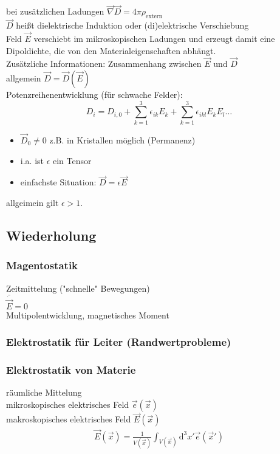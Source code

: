 \documentclass[a4paper]{article}
\begin{document}
bei zusätzlichen Ladungen $\vec{\nabla}\vec{D}=4\pi\rho_{\text{extern}}$\\
$\vec{D}$ heißt dielektrische Induktion oder (di)elektrische Verschiebung\\
Feld $\vec{E}$ verschiebt im mikroskopischen Ladungen und erzeugt damit eine
Dipoldichte, die von den Materialeigenschaften abhängt.\\
Zusätzliche Informationen: Zusammenhang zwischen $\vec{E}$ und $\vec{D}$\\
allgemein $\vec{D}=\vec{D}(\vec{E})$\\
Potenzreihenentwicklung (für schwache Felder):\\
\begin{equation}
D_i=D_{i,0}+\sum_{k=1}^3 \epsilon_{ik}E_k+\sum_{k=1}^3 \epsilon_{ikl}E_kE_l \ldots
\end{equation} 
\begin{itemize}
  \item $\vec{D}_0\neq0$ z.B. in Kristallen möglich (Permanenz)
  \item i.a. ist $\epsilon$ ein Tensor
  \item einfachste Situation: $\vec{D}=\epsilon\vec{E}$
\end{itemize}

allgeimein gilt $\epsilon>1$.

\subsection{Wiederholung}
\subsubsection{Magentostatik}
Zeitmittelung ("schnelle" Bewegungen)\\
$\bar{\dot{\vec{E}}}=0$\\
Multipolentwicklung, magnetisches Moment\\
\subsubsection{Elektrostatik für Leiter (Randwertprobleme)}
\subsubsection{Elektrostatik von Materie}
räumliche Mittelung\\
mikroskopisches elektrisches Feld $\vec{e}(\vec{x})$\\
makroskopisches elektrisches Feld $\vec{E}(\vec{x})$\\
\begin{align}
\vec{E}(\vec{x})=\frac{1}{V(\vec{x})}\int_{V(\vec{x})} \mathrm{d}^3x' \vec{e}(\vec{x}')
\end{align}
\end{document}
